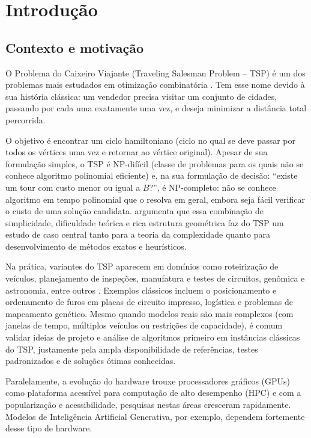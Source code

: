 \chapter{Introdução}\label{cap1-introducao}

\section{Contexto e motivação}\label{sec-11-contexto-e-motivacao}

O Problema do Caixeiro Viajante (Traveling Salesman Problem -- TSP) é um dos problemas mais estudados em otimização combinatória \autocite{cook2012pursuit}.
Tem esse nome devido à sua história clássica: um vendedor precisa visitar um conjunto de cidades, passando por cada uma exatamente uma vez, e deseja minimizar a distância total percorrida.

O objetivo é encontrar um ciclo hamiltoniano (ciclo no qual se deve passar por todos os vértices uma vez e retornar ao vértice original).
Apesar de sua formulação simples, o TSP é NP-difícil (classe de problemas para os quais não se conhece algoritmo polinomial eficiente) e, na sua formulação de decisão: ``existe um tour com custo menor ou igual a \(B\)?'', é NP-completo: não se conhece algoritmo em tempo polinomial que o resolva em geral, embora seja fácil verificar o custo de uma solução candidata. \textcite{cook2012pursuit} argumenta que essa combinação de simplicidade, dificuldade teórica e rica estrutura geométrica faz do TSP um estudo de caso central tanto para a teoria da complexidade quanto para desenvolvimento de métodos exatos e heurísticos.

Na prática, variantes do TSP aparecem em domínios como roteirização de veículos, planejamento de inspeções, manufatura e testes de circuitos, genômica e astronomia, entre outros \autocite{cook2012pursuit}.
Exemplos clássicos incluem o posicionamento e ordenamento de furos em placas de circuito impresso, logística e problemas de mapeamento genético.
Mesmo quando modelos reais são mais complexos (com janelas de tempo, múltiplos veículos ou restrições de capacidade), é comum validar ideias de projeto e análise de algoritmos primeiro em instâncias clássicas do TSP, justamente pela ampla disponibilidade de referências, testes padronizados e de soluções ótimas conhecidas.

Paralelamente, a evolução do hardware trouxe processadores gráficos (GPUs) como plataforma acessível para computação de alto desempenho (HPC) \autocite{nvidia2024cuda} e com a popularização e acessibilidade, pesquisas nestas áreas cresceram rapidamente.
Modelos de Inteligência Artificial Generativa, por exemplo, dependem fortemente desse tipo de hardware.

